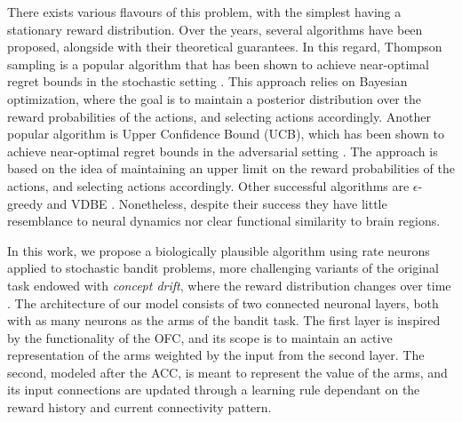 \hfill \break
There exists various flavours of this problem, with the simplest having a stationary reward distribution.
Over the years, several algorithms have been proposed, alongside with their theoretical guarantees.
In this regard, Thompson sampling is a popular algorithm that has been shown to achieve near-optimal regret bounds in the stochastic setting \cite{agrawalAnalysisThompsonSampling2012, kaufmannThompsonSamplingAsymptotically2012}.
This approach relies on Bayesian optimization, where the goal is to maintain a posterior distribution over the reward probabilities of the actions, and selecting actions accordingly.
Another popular algorithm is Upper Confidence Bound (UCB), which has been shown to achieve near-optimal regret bounds in the adversarial setting \cite{auerFinitetimeAnalysisMultiarmed2002}.
The approach is based on the idea of maintaining an upper limit on the reward probabilities of the actions, and selecting actions accordingly.
Other successful algorithms are $\epsilon$-greedy and VDBE \cite{gittinsBanditProcessesDynamic1979, banMultifacetContextualBandits2021, tokicAdaptiveEGreedyExploration2010, tokicValueDifferenceBasedExploration2011}.
Nonetheless, despite their success they have little resemblance to neural dynamics nor clear functional similarity to brain regions.

In this work, we propose a biologically plausible algorithm using rate neurons applied to stochastic bandit problems, more challenging variants of the original task endowed with \textit{concept drift}, where the reward distribution changes over time \cite{garivierUpperConfidenceBoundPolicies2008, besbesStochasticMultiArmedBanditProblem2014, cavenaghiNonStationaryMultiArmed2021}.
The architecture of our model consists of two connected neuronal layers, both with as many neurons as the arms of the bandit task.
The first layer is inspired by the functionality of the OFC, and its scope is to maintain an active representation of the arms weighted by the input from the second layer.
The second, modeled after the ACC, is meant to represent the value of the arms, and its input connections are updated through a learning rule dependant on the reward history and current connectivity pattern.

